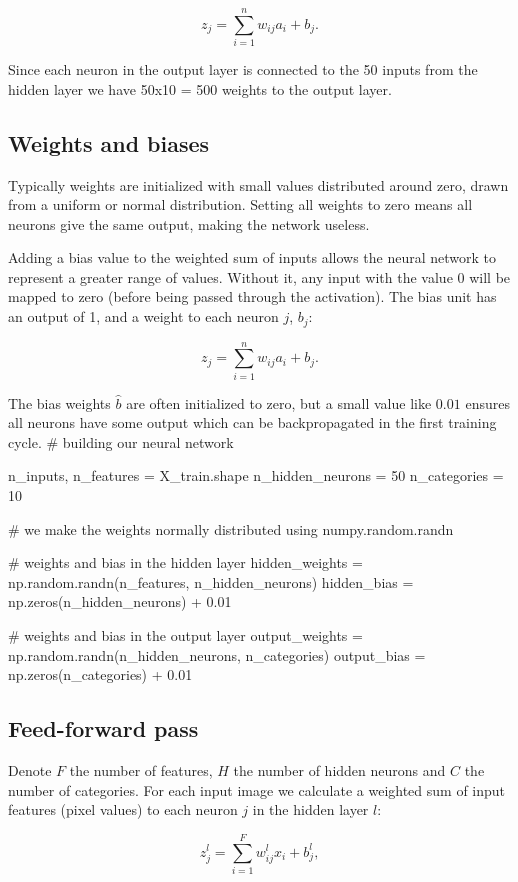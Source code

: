 \documentclass[%
oneside,                 %
final,                   %
10pt]{article}
\begin{document}
$$ z_j = \sum_{i=1}^n w_ {ij} a_i+b_j.$$  

Since each neuron in the output layer is connected to the 50 inputs from the hidden layer we have 50x10 = 500
weights to the output layer.

\subsection{Weights and biases}

Typically weights are initialized with small values distributed around zero, drawn from a uniform
or normal distribution. Setting all weights to zero means all neurons give the same output, making the network useless.  

Adding a bias value to the weighted sum of inputs allows the neural network to represent a greater range
of values. Without it, any input with the value 0 will be mapped to zero (before being passed through the activation). The bias unit has an output of 1, and a weight to each neuron $j$, $b_j$:  

$$ z_j = \sum_{i=1}^n w_ {ij} a_i + b_j.$$  

The bias weights $\hat{b}$ are often initialized to zero, but a small value like $0.01$ ensures all neurons have some output which can be backpropagated in the first training cycle.
\bpycod
# building our neural network

n_inputs, n_features = X_train.shape
n_hidden_neurons = 50
n_categories = 10

# we make the weights normally distributed using numpy.random.randn

# weights and bias in the hidden layer
hidden_weights = np.random.randn(n_features, n_hidden_neurons)
hidden_bias = np.zeros(n_hidden_neurons) + 0.01

# weights and bias in the output layer
output_weights = np.random.randn(n_hidden_neurons, n_categories)
output_bias = np.zeros(n_categories) + 0.01
\epycod

\subsection{Feed-forward pass}

Denote $F$ the number of features, $H$ the number of hidden neurons and $C$ the number of categories.  
For each input image we calculate a weighted sum of input features (pixel values) to each neuron $j$ in the hidden layer $l$:  

$$ z_{j}^{l} = \sum_{i=1}^{F} w_{ij}^{l} x_i + b_{j}^{l},$$
\end{document}

